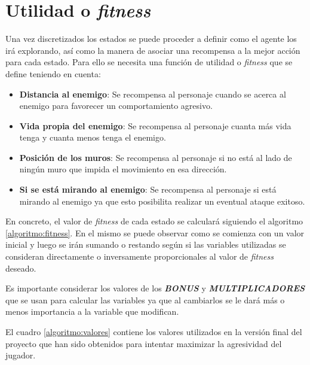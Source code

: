 \section{Utilidad o \textit{fitness}}

Una vez discretizados los estados se puede proceder a definir como el agente los irá explorando, así como la manera de asociar una recompensa a la mejor acción para cada estado. Para ello se necesita una función de utilidad o \textit{fitness} que se define teniendo en cuenta:

\begin{itemize}
	\item \textbf{Distancia al enemigo}: Se recompensa al personaje cuando se acerca al enemigo para favorecer un comportamiento agresivo.
	\item \textbf{Vida propia del enemigo}: Se recompensa al personaje cuanta más vida tenga y cuanta menos tenga el enemigo.
	\item \textbf{Posición de los muros}: Se recompensa al personaje si no está al lado de ningún muro que impida el movimiento en esa dirección.
	\item \textbf{Si se está mirando al enemigo}: Se recompensa al personaje si está mirando al enemigo ya que esto posibilita realizar un eventual ataque exitoso.
\end{itemize}

\bigskip

En concreto, el valor de \textit{fitness} de cada estado se calculará siguiendo el algoritmo \ref{algoritmo:fitness}. En el mismo se puede observar como se comienza con un valor inicial y luego se irán sumando o restando según si las variables utilizadas se consideran directamente o inversamente proporcionales al valor de \textit{fitness} deseado.

\bigskip

Es importante considerar los valores de los \textbf{\textit{BONUS}} y \textbf{\textit{MULTIPLICADORES}} que se usan para calcular las variables ya que al cambiarlos se le dará más o menos importancia a la variable que modifican.

\bigskip

El cuadro \ref{algoritmo:valores} contiene los valores utilizados en la versión final del proyecto que han sido obtenidos para intentar maximizar la agresividad del jugador.

\bigskip

